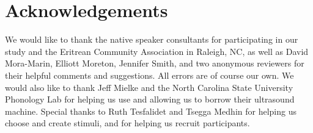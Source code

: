\documentclass[output=paper
,newtxmath
,modfonts
,nonflat]{langsci/langscibook}
\begin{document}
\section*{Acknowledgements}

We would like to thank the native speaker consultants for participating in our study and the Eritrean Community Association in Raleigh, NC, as well as David Mora-Marin, Elliott Moreton, Jennifer Smith, and two anonymous reviewers for their helpful comments and suggestions. All errors are of course our own. We would also like to thank Jeff Mielke and the North Carolina State University Phonology Lab for helping us use and allowing us to borrow their ultrasound machine. Special thanks to Ruth Tesfalidet and Tsegga Medhin for helping us choose and create stimuli, and for helping us recruit participants.
 

\sloppy
\printbibliography[heading=subbibliography,notkeyword=this]
\end{document}
